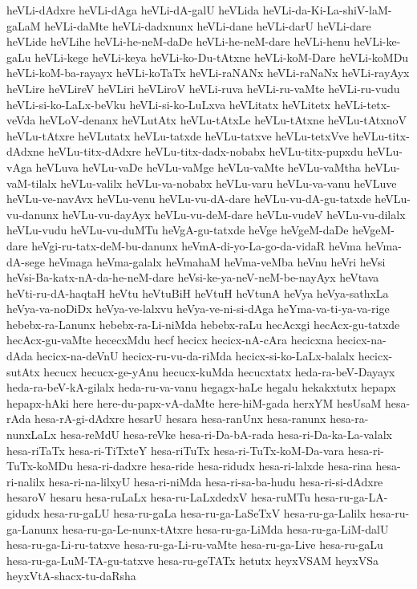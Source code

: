 {heVLi-dAdxre
heVLi-dAga
heVLi-dA-galU
heVLida
heVLi-da-Ki-La-shiV-laM-gaLaM
heVLi-daMte
heVLi-dadxnunx
heVLi-dane
heVLi-darU
heVLi-dare
heVLide
heVLihe
heVLi-he-neM-daDe
heVLi-he-neM-dare
heVLi-henu
heVLi-ke-gaLu
heVLi-kege
heVLi-keya
heVLi-ko-Du-tAtxne
heVLi-koM-Dare
heVLi-koMDu
heVLi-koM-ba-rayayx
heVLi-koTaTx
heVLi-raNANx
heVLi-raNaNx
heVLi-rayAyx
heVLire
heVLireV
heVLiri
heVLiroV
heVLi-ruva
heVLi-ru-vaMte
heVLi-ru-vudu
heVLi-si-ko-LaLx-beVku
heVLi-si-ko-LuLxva
heVLitatx
heVLitetx
heVLi-tetx-veVda
heVLoV-denanx
heVLutAtx
heVLu-tAtxLe
heVLu-tAtxne
heVLu-tAtxnoV
heVLu-tAtxre
heVLutatx
heVLu-tatxde
heVLu-tatxve
heVLu-tetxVve
heVLu-titx-dAdxne
heVLu-titx-dAdxre
heVLu-titx-dadx-nobabx
heVLu-titx-pupxdu
heVLu-vAga
heVLuva
heVLu-vaDe
heVLu-vaMge
heVLu-vaMte
heVLu-vaMtha
heVLu-vaM-tilalx
heVLu-valilx
heVLu-va-nobabx
heVLu-varu
heVLu-va-vanu
heVLuve
heVLu-ve-navAvx
heVLu-venu
heVLu-vu-dA-dare
heVLu-vu-dA-gu-tatxde
heVLu-vu-danunx
heVLu-vu-dayAyx
heVLu-vu-deM-dare
heVLu-vudeV
heVLu-vu-dilalx
heVLu-vudu
heVLu-vu-duMTu
heVgA-gu-tatxde
heVge
heVgeM-daDe
heVgeM-dare
heVgi-ru-tatx-deM-bu-danunx
heVmA-di-yo-La-go-da-vidaR
heVma
heVma-dA-sege
heVmaga
heVma-galalx
heVmahaM
heVma-veMba
heVnu
heVri
heVsi
heVsi-Ba-katx-nA-da-he-neM-dare
heVsi-ke-ya-neV-neM-be-nayAyx
heVtava
heVti-ru-dA-haqtaH
heVtu
heVtuBiH
heVtuH
heVtunA
heVya
heVya-sathxLa
heVya-va-noDiDx
heVya-ve-lalxvu
heVya-ve-ni-si-dAga
heYma-va-ti-ya-va-rige
hebebx-ra-Lanunx
hebebx-ra-Li-niMda
hebebx-raLu
hecAcxgi
hecAcx-gu-tatxde
hecAcx-gu-vaMte
hececxMdu
hecf
hecicx
hecicx-nA-cAra
hecicxna
hecicx-na-dAda
hecicx-na-deVnU
hecicx-ru-vu-da-riMda
hecicx-si-ko-LaLx-balalx
hecicx-sutAtx
hecucx
hecucx-ge-yAnu
hecucx-kuMda
hecucxtatx
heda-ra-beV-Dayayx
heda-ra-beV-kA-gilalx
heda-ru-va-vanu
hegagx-haLe
hegalu
hekakxtutx
hepapx
hepapx-hAki
here
here-du-papx-vA-daMte
here-hiM-gada
herxYM
hesUsaM
hesa-rAda
hesa-rA-gi-dAdxre
hesarU
hesara
hesa-ranUnx
hesa-ranunx
hesa-ra-nunxLaLx
hesa-reMdU
hesa-reVke
hesa-ri-Da-bA-rada
hesa-ri-Da-ka-La-valalx
hesa-riTaTx
hesa-ri-TiTxteY
hesa-riTuTx
hesa-ri-TuTx-koM-Da-vara
hesa-ri-TuTx-koMDu
hesa-ri-dadxre
hesa-ride
hesa-ridudx
hesa-ri-lalxde
hesa-rina
hesa-ri-nalilx
hesa-ri-na-lilxyU
hesa-ri-niMda
hesa-ri-sa-ba-hudu
hesa-ri-si-dAdxre
hesaroV
hesaru
hesa-ruLaLx
hesa-ru-LaLxdedxV
hesa-ruMTu
hesa-ru-ga-LA-gidudx
hesa-ru-gaLU
hesa-ru-gaLa
hesa-ru-ga-LaSeTxV
hesa-ru-ga-Lalilx
hesa-ru-ga-Lanunx
hesa-ru-ga-Le-nunx-tAtxre
hesa-ru-ga-LiMda
hesa-ru-ga-LiM-dalU
hesa-ru-ga-Li-ru-tatxve
hesa-ru-ga-Li-ru-vaMte
hesa-ru-ga-Live
hesa-ru-gaLu
hesa-ru-ga-LuM-TA-gu-tatxve
hesa-ru-geTATx
hetutx
heyxVSAM
heyxVSa
heyxVtA-shacx-tu-daRsha
}
